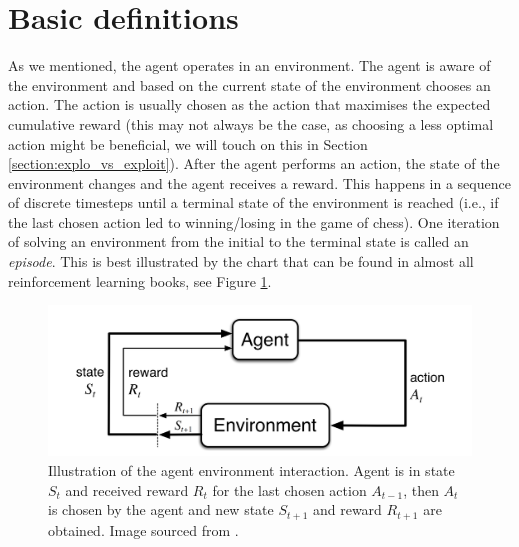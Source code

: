 \section{Basic definitions}
As we mentioned, the agent operates in an environment. The agent is aware of the environment and based on the current state of the environment chooses an action. The action is usually chosen as the action that maximises the expected cumulative reward (this may not always be the case, as choosing a less optimal action might be beneficial, we will touch on this in Section \ref{section:explo_vs_exploit}). After the agent performs an action, the state of the environment changes and the agent receives a reward. This happens in a sequence of discrete timesteps until a terminal state of the environment is reached (i.e., if the last chosen action led to winning/losing in the game of chess). One iteration of solving an environment from the initial to the terminal state is called an \textit{episode}. This is best illustrated by the chart that can be found in almost all reinforcement learning books, see Figure \ref{fig:agent_environment_interaction}.

\begin{figure}
  \includegraphics[width=\linewidth]{../img/agent_environment_interaction.png}
  \caption{Illustration of the agent environment interaction. Agent is in state $S_t$ and received reward $R_t$ for the last chosen action $A_{t-1}$, then $A_t$ is chosen by the agent and new state $S_{t+1}$ and reward $R_{t+1}$ are obtained. Image sourced from \cite[Figure 3.1.]{sutton2018reinforcement}.}
  \label{fig:agent_environment_interaction}
\end{figure}

